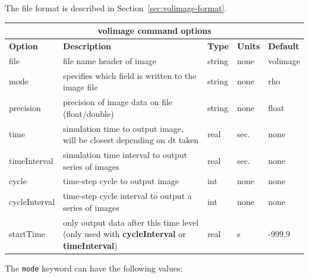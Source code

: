 \documentclass[11pt]{report}
\begin{document}
The file format is described in Section~\ref{sec:volimage-format}.
%
\begin{center}
\begin{tabular}{|l|p{8cm}|l|l|l|} \hline
\multicolumn{5}{|c|}{\bf volimage command options}\\ \hline
{\bf Option} & {\bf Description}          & {\bf Type} & {\bf Units} & {\bf Default} \\ \hline 
\hline
file        & file name header of image                          & string & none & volimage \\ \hline
mode        & specifies which field is written to the image file & string & none & rho \\  \hline
precision   & precision of image data on file (float/double)     & string & none & float \\ \hline
time          & simulation time to output image, will be closest depending on dt taken & real  & sec.  & none \\ \hline
timeInterval  & simulation time interval to output series of images                    & real  & sec.  & none \\ \hline
cycle         & time-step cycle to output image                                        & int   & none  & none \\ \hline
cycleInterval & time-step cycle interval to output a series of images                  & int   & none & none \\ \hline
startTime     & only output data after this time level (only used with {\bf cycleInterval} or {\bf
 timeInterval}) & real & s & -999.9 \\ \hline 
\end{tabular}
\end{center}
%
The \verb+mode+ keyword can have the following values:
%
\end{document}
